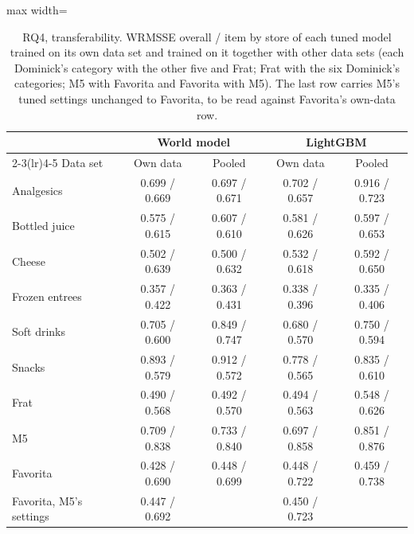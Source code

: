 \begin{table}[t]
\centering\footnotesize\setlength{\tabcolsep}{3pt}
\caption{RQ4, transferability. WRMSSE overall / item by store of each tuned model trained on its own data set and
trained on it together with other data sets (each Dominick's category with the other five and Frat; Frat with the
six Dominick's categories; M5 with Favorita and Favorita with M5). The last row carries M5's tuned settings
unchanged to Favorita, to be read against Favorita's own-data row.}
\label{tab:rq-retailer}
\begin{adjustbox}{max width=\textwidth}\begin{tabular}{l cc cc}
\toprule
 & \multicolumn{2}{c}{World model} & \multicolumn{2}{c}{LightGBM}\\
\cmidrule(lr){2-3}\cmidrule(lr){4-5}
Data set & Own data & Pooled & Own data & Pooled\\
\midrule
Analgesics & 0.699 / 0.669 & 0.697 / 0.671 & 0.702 / 0.657 & 0.916 / 0.723 \\
Bottled juice & 0.575 / 0.615 & 0.607 / 0.610 & 0.581 / 0.626 & 0.597 / 0.653 \\
Cheese & 0.502 / 0.639 & 0.500 / 0.632 & 0.532 / 0.618 & 0.592 / 0.650 \\
Frozen entrees & 0.357 / 0.422 & 0.363 / 0.431 & 0.338 / 0.396 & 0.335 / 0.406 \\
Soft drinks & 0.705 / 0.600 & 0.849 / 0.747 & 0.680 / 0.570 & 0.750 / 0.594 \\
Snacks & 0.893 / 0.579 & 0.912 / 0.572 & 0.778 / 0.565 & 0.835 / 0.610 \\
Frat & 0.490 / 0.568 & 0.492 / 0.570 & 0.494 / 0.563 & 0.548 / 0.626 \\
M5 & 0.709 / 0.838 & 0.733 / 0.840 & 0.697 / 0.858 & 0.851 / 0.876 \\
Favorita & 0.428 / 0.690 & 0.448 / 0.699 & 0.448 / 0.722 & 0.459 / 0.738 \\
\midrule
Favorita, M5's settings & 0.447 / 0.692 & & 0.450 / 0.723 & \\
\bottomrule
\end{tabular}\end{adjustbox}
\end{table}
